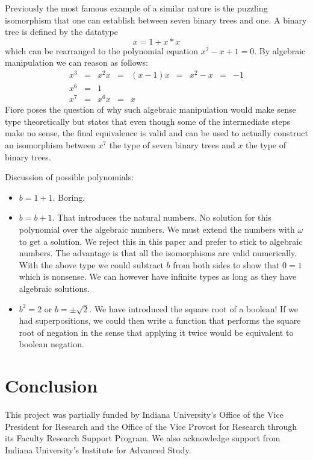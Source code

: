 \documentclass[preprint]{sigplanconf}
\begin{document}
Previously the most famous example of a similar nature is the puzzling
isomorphism that one can establish between seven binary trees and one.
A binary tree is defined by the datatype
\[
x = 1 + x * x 
\]
which can be rearranged to the polynomial equation $x^2 - x + 1 = 0$. By
algebraic manipulation we can reason as follows:
\[\begin{array}{rclclclcl}
x^3 &=& x^2 x &=& (x-1) x &=& x^2 - x &=& -1 \\
x^6 &=& 1 \\
x^7 &=& x^6 x &=& x
\end{array}\]
Fiore poses the question of why such algebraic manipulation would make sense
type theoretically but states that even though some of the intermediate steps
make no sense, the final equivalence is valid and can be used to actually
construct an isomorphism between $x^7$ the type of seven binary trees 
and $x$ the type of binary trees.

Discussion of possible polynomials:
\begin{itemize}
\item $b=1+1$. Boring.
\item $b=b+1$. That introduces the natural numbers. No solution for this
  polynomial over the algebraic numbers. We must extend the numbers with
  $\omega$ to get a solution. We reject this in this paper and prefer to
  stick to algebraic numbers. The advantage is that all the isomorphisms are
  valid numerically. With the above type we could subtract $b$ from both
  sides to show that $0=1$ which is nonsense. We can however have infinite
  types as long as they have algebraic solutions.
\item $b^2=2$ or $b = \pm \sqrt{2}$. We have introduced the square root of a
  boolean! If we had superpositions, we could then write a function that
  performs the square root of negation in the sense that applying it twice
  would be equivalent to boolean negation.
\end{itemize}

\section{Conclusion}


\acks This project was partially funded by Indiana University's Office
of the Vice President for Research and the Office of the Vice Provost
for Research through its Faculty Research Support Program.  We also
acknowledge support from Indiana University's Institute for Advanced
Study.

\begin{small}


\end{small}
\end{document}
